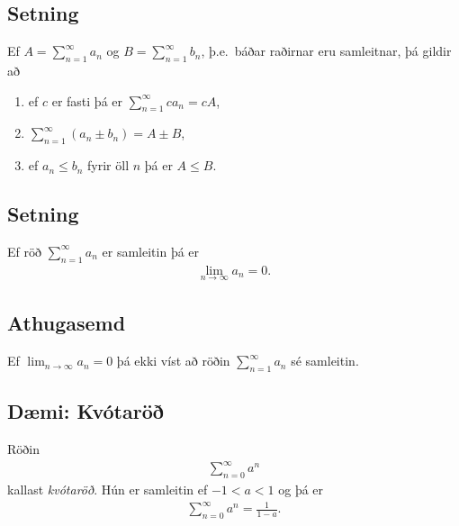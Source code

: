 \documentclass[b5paper,11pt,icelandic]{sphinxmanual}
\begin{document}
\subsection{Setning}
\label{kafli09:id7}
Ef \(A=\sum_{n=1}^\infty a_n\) og \(B=\sum_{n=1}^\infty b_n\),
þ.e. báðar raðirnar eru samleitnar, þá gildir að
\begin{enumerate}
\item {} 
ef \(c\) er fasti þá er \(\sum_{n=1}^\infty ca_n=cA\),

\item {} 
\(\sum_{n=1}^\infty (a_n\pm b_n)=A\pm B\),

\item {} 
ef \(a_n\leq b_n\) fyrir öll \(n\) þá er \(A\leq B\).

\end{enumerate}


\subsection{Setning}
\label{kafli09:id8}
Ef röð \(\sum_{n=1}^\infty a_n\) er samleitin þá er
\begin{equation*}
\begin{split}\lim_{n\rightarrow\infty}a_n=0.\end{split}
\end{equation*}

\subsection{Athugasemd}
\label{kafli09:athugasemd}
Ef \(\lim_{n \to \infty} a_n = 0\) þá ekki víst að röðin
\(\sum_{n=1}^\infty a_n\) sé samleitin.


\subsection{Dæmi: Kvótaröð}
\label{kafli09:daemi-kvotaro}\label{kafli09:index-7}
Röðin
\begin{equation*}
\begin{split}\sum_{n=0}^\infty a^n\end{split}
\end{equation*}
kallast \emph{kvótaröð}. Hún er samleitin ef \(-1<a<1\) og þá er
\begin{equation*}
\begin{split}\sum_{n=0}^\infty a^n = \frac{1}{1-a}.\end{split}
\end{equation*}
\end{document}
